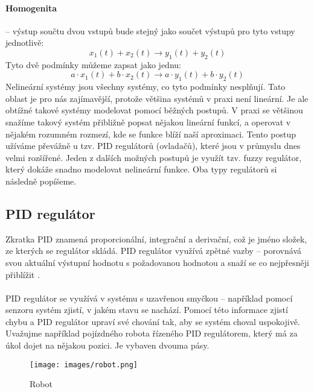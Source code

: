 \documentclass[
  program=inf,
  figures,
  tables,
  glossaries,
  index
]{kidiplom}
\begin{document}
\paragraph{Homogenita} -- výstup součtu dvou vstupů bude stejný jako součet výstupů pro tyto vstupy jednotlivě:
\[ x_{1}(t) + x_{2}(t) \rightarrow y_{1}(t) + y_{2}(t) \]
Tyto dvě podmínky můžeme zapsat jako jednu:
\[ a \cdot x_{1}(t) + b \cdot x_{2}(t) \rightarrow a \cdot y_{1}(t) + b \cdot y_{2}(t) \]
Nelineární systémy jsou všechny systémy, co tyto podmínky nesplňují. Tato oblast je pro nás zajímavější, protože většina systémů v praxi není lineární. Je ale obtížné takové systémy modelovat pomocí běžných postupů. V praxi se většinou snažíme takový systém přibližně popsat nějakou lineární funkcí, a operovat v nějakém rozumném rozmezí, kde se funkce blíží naší aproximaci. Tento postup užíváme převážně u tzv. PID regulátorů (ovladačů), které jsou v průmyslu dnes velmi rozšířené. Jeden z dalších možných postupů je využít tzv. fuzzy regulátor, který dokáže snadno modelovat nelineární funkce. Oba typy regulátorů si následně popíšeme. 

\subsection{PID regulátor}
Zkratka PID znamená proporcionální, integrační a derivační, což je jméno složek, ze kterých se regulátor skládá. PID regulátor využívá zpětné vazby -- porovnává svou aktuální výstupní hodnotu s požadovanou hodnotou a snaží se co nejpřesněji přiblížit \cite{bPID1}. \\ \\
PID regulátor se využívá v systému s uzavřenou smyčkou -- například pomocí senzoru systém zjistí, v jakém stavu se nachází. Pomocí této informace zjistí chybu a PID regulátor upraví své chování tak, aby se systém choval uspokojivě. Uvažujme například pojízdného robota řízeného PID regulátorem, který má za úkol dojet na nějakou pozici. Je vybaven dvouma pásy.
\begin{figure}[h]
\centering
\texttt{[image: images/robot.png]}
\caption{Robot}
\end{figure}
\end{document}

